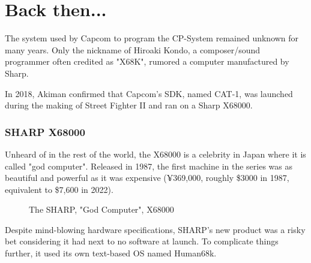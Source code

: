 

















\pagebreak

\section{Back then...}
The system used by Capcom to program the CP-System remained unknown for many years. Only the nickname of Hiroaki Kondo, a composer/sound programmer often credited as "X68K", rumored a computer manufactured by Sharp. 

In 2018,  Akiman confirmed\cite{x68000usage1}\cite{x68000usage2} that Capcom's SDK, named CAT-1, was launched during the making of Street Fighter II and ran on a Sharp X68000.

\subsubsection{SHARP X68000}

Unheard of in the rest of the world, the X68000 is a celebrity in Japan where it is called "god computer". 
Released in 1987, the first machine in the series was as beautiful and powerful as it was expensive (¥369,000, roughly \$3000 in 1987, equivalent to \$7,600 in 2022).

\vfill

 \begin{figure}[H]
\caption*{The SHARP, "God Computer", X68000 }
\end{figure}


Despite mind-blowing hardware specifications, SHARP's new product was a risky bet considering it had next to no software at launch. To complicate things further, it used its own text-based OS named Human68k.


